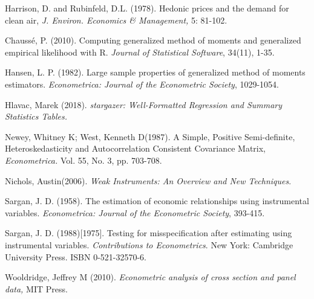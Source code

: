 \documentclass{article}
\theoremstyle{definition}
\begin{document}
\newpage
\begin{thebibliography}{99} 
	
	Harrison, D. and Rubinfeld, D.L. (1978). Hedonic prices and the demand for clean air, \textit{J. Environ. Economics \& Management,} 5: 81-102.
	
	Chaussé, P. (2010). Computing generalized method of moments and generalized empirical likelihood with R. 
	\textit{Journal of Statistical Software}, 34(11), 1-35.
	
	Hansen, L. P. (1982). Large sample properties of generalized method of moments estimators. \textit{Econometrica: Journal of the Econometric Society}, 1029-1054.
	
	Hlavac, Marek (2018). 
	\textit{stargazer: Well-Formatted Regression and Summary Statistics Tables.}
	
	
	Newey, Whitney K; West, Kenneth D(1987). A Simple, Positive Semi-definite, Heteroskedasticity and Autocorrelation Consistent Covariance Matrix, \textit{Econometrica.}
	Vol. 55, No. 3, pp. 703-708.
	
	Nichols, Austin(2006). \textit{Weak Instruments: An Overview and New Techniques}.
	
	Sargan, J. D. (1958). The estimation of economic relationships using instrumental variables. \textit{Econometrica: Journal of the Econometric Society}, 393-415.
	
	Sargan, J. D. (1988)[1975]. Testing for misspecification after estimating using instrumental variables. \textit{Contributions to Econometrics}. New York: Cambridge University Press. ISBN 0-521-32570-6.
	
	Wooldridge, Jeffrey M (2010). \textit{Econometric analysis of cross section and panel data,} MIT Press. 
	
	
	
\end{thebibliography}
 
\end{document}
